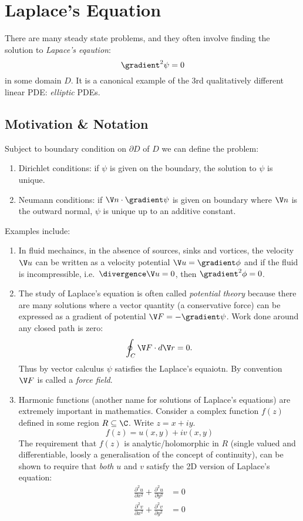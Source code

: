 \documentclass[a4paper]{article}
\newcommand*{\grad}{\gradient}
\newcommand*{\dive}{\divergence}
\newcommand*{\laplace}{\grad^2}
\newcommand*{\lap}{\laplace}
\begin{document}
\section{Laplace's Equation}

There are many steady state problems, and they often involve finding the solution to \emph{Lapace's eqaution}:
\[
  \lap \psi = 0
\]
in some domain \(D\). It is a canonical example of the \(3\)rd qualitatively different linear PDE: \emph{elliptic} PDEs.

\subsection{Motivation \& Notation}

Subject to boundary condition on \(\partial D\) of \(D\) we can define the problem:
\begin{enumerate}
\item Dirichlet conditions: if \(\psi\) is given on the boundary, the solution to \(\psi\) is unique.
\item Neumann conditions: if \(\V n \cdot \grad \psi\) is given on boundary where \(\V n\) is the outward normal, \(\psi\) is unique up to an additive constant.
\end{enumerate}

Examples include:
\begin{enumerate}
\item In fluid mechaincs, in the absence of sources, sinks and vortices, the velocity \(\V u\) can be written as a velocity potential \(\V u = \grad \phi\) and if the fluid is incompressible, i.e.\ \(\dive \V u = 0\), then \(\lap \phi = 0\).
\item The study of Laplace's equation is often called \emph{potential theory} because there are many solutions where a vector quantity (a conservative force) can be expressed as a gradient of potential \(\V F = -\grad \psi\). Work done around any closed path is zero:
  \[
    \oint_C \V F \cdot d\V r = 0.
  \]
  Thus by vector calculus \(\psi\) satisfies the Laplace's equaiotn. By convention \(\V F\) is called a \emph{force field}.
\item Harmonic functions (another name for solutions of Laplace's equations) are extremely important in mathematics. Consider a complex function \(f(z)\) defined in some region \(R \subseteq \C\). Write \(z = x + iy\).
\[
  f(z) = u(x, y) + iv(x, y)
\]
The requirement that \(f(z)\) is analytic/holomorphic in \(R\) (single valued and differentiable, loosly a generalisation of the concept of continuity), can be shown to require that \emph{both} \(u\) and \(v\) satisfy the 2D version of Laplace's equation:
\begin{align*}
  \frac{\partial^2 u}{\partial x^2} + \frac{\partial^2 u}{\partial y^2}  &= 0 \\
  \frac{\partial^2 v}{\partial x^2} + \frac{\partial^2 v}{\partial y^2}  &= 0
\end{align*}
\end{enumerate}
\end{document}
